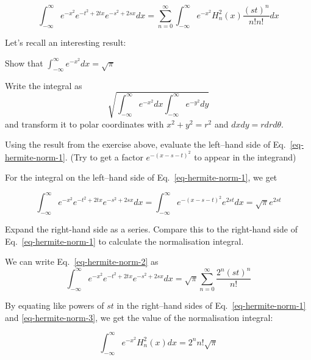\begin{equation}
\int_{-\infty}^{\infty} e^{-x^2} e^{-t^2 + 2tx} e^{-s^2 + 2sx} dx= \sum_{n = 0}^{\infty} \int_{-\infty}^{\infty} e^{-x^2} H_n^2(x)\frac{(st)^n}{n!n!} dx \label{eq-hermite-norm-1}
\end{equation}

Let's recall an interesting result:
\begin{exer}
Show that $\int_{-\infty}^{\infty}e^{-x^2}dx = \sqrt{\pi}$
\begin{hnt}
Write the integral as
$$\sqrt{\int_{-\infty}^{\infty} e^{-x^2}dx\int_{-\infty}^{\infty} e^{-y^2}dy}$$
and transform it to polar coordinates with $x^2+y^2=r^2$ and $dxdy = r dr d\theta$.
\end{hnt}
\end{exer}

\begin{cue}
Using the result from the exercise above, evaluate the left--hand side of Eq.~\ref{eq-hermite-norm-1}. (Try to get a factor $e^{-(x-s-t)^2}$ to appear in the integrand)
\end{cue}

For the integral on the left--hand side of Eq.~\ref{eq-hermite-norm-1}, we get 

\begin{equation}
\int_{-\infty}^{\infty} e^{-x^2} e^{-t^2 + 2tx} e^{-s^2 + 2sx} dx 
  =  \int_{-\infty}^{\infty} e^{-(x-s-t)^2} e^{2st}dx = \sqrt{\pi} e^{2st}
  \label{eq-hermite-norm-2} 
\end{equation} 

\begin{cue}
Expand the right-hand side as a series. Compare this to the right-hand side of Eq.~\ref{eq-hermite-norm-1} to calculate the normalisation integral.
\end{cue}

We can write Eq.~\ref{eq-hermite-norm-2} as
\begin{equation}
  \int_{-\infty}^{\infty} e^{-x^2} e^{-t^2 + 2tx} e^{-s^2 + 2sx} dx 
    =  \sqrt{\pi} \sum_{n = 0}^{\infty} \frac{2^n{(st)}^n}{n!}  \label{eq-hermite-norm-3}
\end{equation} 
  
By equating like powers of $st$ in the right--hand sides of Eq.~\ref{eq-hermite-norm-1} and \ref{eq-hermite-norm-3}, we get the value of the normalisation integral:

\begin{equation}
\int_{-\infty}^{\infty} e^{-x^2} H_n^2(x) dx = 2^n n! \sqrt{\pi}
\end{equation} 

